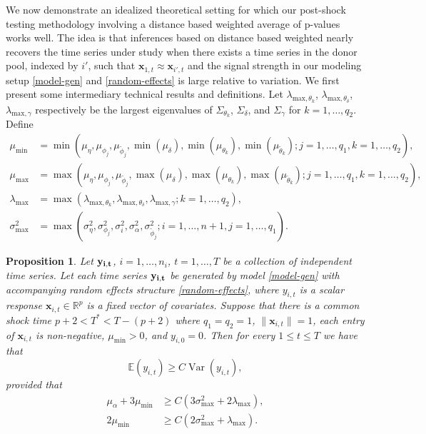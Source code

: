 \documentclass[11pt]{article}
\newcommand{\R}{\mathbb{R}}
\newcommand{\x}{\textbf{x}}
\def\E{\mathbb{E}} %
\DeclareMathOperator{\Var}{Var} %
\newtheorem{prop}{Proposition}
\theoremstyle{definition}
\begin{document}
\vspace*{0.5cm} We now demonstrate an idealized theoretical setting for which our post-shock testing methodology involving a distance based weighted average of p-values works well. The idea is that inferences based on distance based weighted nearly recovers the time series under study when there exists a time series in the donor pool, indexed by $i'$, such that $\x_{1,t} \approx \x_{i',t}$ and the signal strength in our modeling setup \eqref{model-gen} and \eqref{random-effects} is large relative to variation. We first present some intermediary technical results and definitions. Let $\lambda_{\text{max},\theta_k}$, $\lambda_{\text{max},\theta_\delta}$, $\lambda_{\text{max},\gamma}$ respectively be the largest eigenvalues of $\Sigma_{\theta_k}$, $\Sigma_{\delta}$, and $\Sigma_{\gamma}$ for $k = 1,\ldots,q_2$. Define  
\begin{align*}
  \mu_{\min} &= \min\left(\mu_\eta,\mu_{\phi_j},\mu_{\tilde\phi_j},\min(\mu_\delta),\min(\mu_{\theta_k}),\min(\mu_{\tilde\theta_k}); j = 1,\ldots,q_1, k = 1,\ldots,q_2\right), \\
  \mu_{\max} &= \max\left(\mu_\eta,\mu_{\phi_j},\mu_{\tilde\phi_j},\max(\mu_\delta),\max(\mu_{\theta_k}),\max(\mu_{\tilde\theta_k}); j = 1,\ldots,q_1, k = 1,\ldots,q_2\right), \\
  \lambda_{\max} &= \max\left(\lambda_{\text{max},\theta_k}, \lambda_{\text{max},\theta_\delta}, \lambda_{\text{max},\gamma}; k = 1,\ldots,q_2\right), \\
  \sigma^2_{\max} &= \max\left(\sigma^2_{\eta},\sigma^2_{\phi_j},\sigma^2_i,\sigma^2_{\alpha},\sigma^2_{\tilde{\phi}_j}; i = 1,\ldots,n+1, j = 1,\ldots,q_1\right).  
\end{align*}



\begin{prop} \label{prop:signaltonoise}
	Let $\bf{y}_{i,t}$, $i = 1,\ldots,n_i$, $t = 1,\ldots, T$ be a collection of independent time series. Let each time series $\bf{y}_{i,t}$ be generated by model \eqref{model-gen} with accompanying random effects structure \eqref{random-effects}, where $y_{i,t}$ is a scalar response $\x_{i,t} \in \R^p$ is a fixed vector of covariates. Suppose that there is a common shock time $p + 2 < T^* < T - (p+2)$ where $q_1 = q_2 = 1$, $\|\x_{i,t}\| = 1$, each entry of $\x_{i,t}$ is non-negative, $\mu_{\min} > 0$, and $y_{i,0} = 0$. Then for every $1 \leq t \leq T$ we have that 
	\begin{equation} \label{signal-to-noise}
	  \E(y_{i,t}) \geq C\Var(y_{i,t}),	
	\end{equation}
	provided that 
	\begin{equation} \label{condition-1}
	\begin{split}
		\mu_\alpha + 3\mu_{\min} &\geq C\left(3\sigma^2_{\max} + 2\lambda_{\max}\right), \\
		2\mu_{\min} &\geq C\left(2\sigma^2_{\max} + \lambda_{\max}\right).	
	\end{split}
	\end{equation}
\end{prop}
\end{document}
